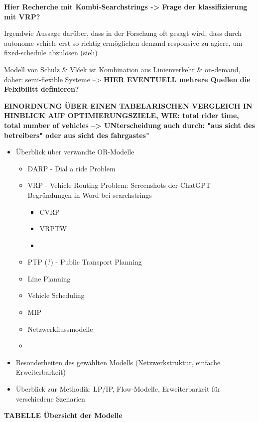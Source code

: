 \textbf{Hier Recherche mit Kombi-Searchstrings -> Frage der klassifizierung mit VRP?}

Irgendwie Aussage darüber, dass in der Forschung oft gesagt wird, dass durch autonome vehicle erst so richtig ermöglichen demand responsive zu agiere, um fixed-schedule abzulösen (sieh)

Modell von Schulz \& Vlćek ist Kombination aus Linienverkehr \& on-demand, daher: semi-flexible Systeme --> \textbf{HIER EVENTUELL mehrere Quellen die Felxibilitt definieren?}

\textbf{EINORDNUNG ÜBER EINEN TABELARISCHEN VERGLEICH IN HINBLICK AUF OPTIMIERUNGSZIELE, WIE: total rider time, total number of vehicles --> UNterscheidung auch durch: "aus sicht des betreibers" oder aus sicht des fahrgastes"}


\begin{itemize}
    \item Überblick über verwandte OR-Modelle
    \begin{itemize}
        \item DARP - Dial a ride Problem
        \item VRP - Vehicle Routing Problem: Screenshots der ChatGPT Begründungen in Word bei searchstrings
        \begin{itemize}
            \item CVRP
            \item VRPTW
            \item 
        \end{itemize}
        \item PTP (?) - Public Transport Planning
        \item Line Planning
        \item Vehicle Scheduling
        \item MIP
        \item Netzwerkflussmodelle
        \item 
    \end{itemize}
    \item Besonderheiten des gewählten Modells (Netzwerkstruktur, einfache Erweiterbarkeit)
    \item Überblick zur Methodik: LP/IP, Flow-Modelle, Erweiterbarkeit für verschiedene Szenarien
\end{itemize}

\begin{center}
    \textbf{TABELLE Übersicht der Modelle}
\end{center}



